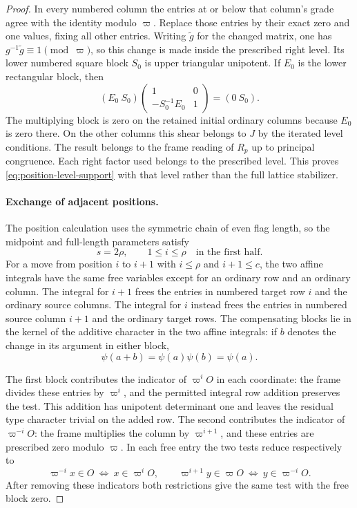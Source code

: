 \begin{proof}
In every numbered column the entries at or below
that column's grade agree with the identity modulo
\(\varpi\). Replace those entries by their exact zero and
one values, fixing all other entries. Writing \(\widetilde g\) for the changed matrix, one has
\(g^{-1}\widetilde g\equiv1\pmod\varpi\), so this change is made
inside the prescribed right level. Its lower numbered square
block \(S_0\) is upper triangular unipotent. If \(E_0\) is
the lower rectangular block, then
\[
     (E_0\ S_0)
         \begin{pmatrix}1&0\\-S_0^{-1}E_0&1\end{pmatrix}
          =(0\ S_0).
\]
The multiplying block is zero on the retained initial ordinary
columns because \(E_0\) is zero there. On the other columns this
shear belongs to \(J\) by the iterated level conditions.
The result belongs to the frame reading of \(R_p\) up to
principal congruence. Each right factor used belongs to
the prescribed level. This proves \eqref{eq:position-level-support}
with that level rather than the full lattice stabilizer.
\label{cor:period-level-support-1}

\paragraph{Exchange of adjacent positions.}
The position calculation uses the symmetric chain of even flag length, so the midpoint and full-length parameters satisfy
\[
 s=2\rho,\qquad 1\le i\le\rho\quad\text{in the first half}.
\] For a move from position \(i\) to \(i+1\) with
\(i\le\rho\) and \(i+1\le c\), the two affine integrals have the
same free variables except for an ordinary row and an ordinary
column. The integral for \(i+1\) frees the entries in numbered
target row \(i\) and the ordinary source columns. The integral
for \(i\) instead frees the entries in numbered source
column \(i+1\) and the ordinary target rows. The compensating blocks lie in the kernel of the additive character in the two affine integrals: if \(b\) denotes the change in its argument in either block,
\[
 \psi(a+b)=\psi(a)\psi(b)=\psi(a).
\]

The first block contributes
the indicator of \(\varpi^iO\) in each coordinate: the frame
divides these entries by \(\varpi^i\), and the permitted
integral row addition preserves the test. This addition has
unipotent determinant one and leaves the residual type
character trivial on the added row. The second contributes
the indicator of \(\varpi^{-i}O\): the frame multiplies the
column by \(\varpi^{i+1}\), and these entries are prescribed
zero modulo \(\varpi\). In each free entry the two tests reduce respectively to
\[
 \varpi^{-i}x\in O\ \Longleftrightarrow\ x\in\varpi^i O,
 \qquad \varpi^{i+1}y\in\varpi O\ \Longleftrightarrow\
                       y\in\varpi^{-i}O .
\]
After removing these indicators both restrictions give the same
test with the free block zero.


\end{proof}
